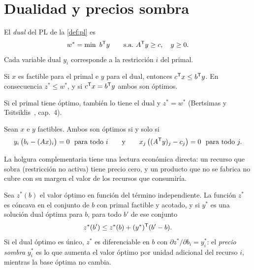 \section{Dualidad y precios sombra}

\begin{definicion}\label{def:dual}
El \emph{dual} del PL de la \cref{def:pl} es
\[
w^{*}=\min\ b^{\mathsf{T}} y\qquad\text{s.a.}\  A^{\mathsf{T}} y\ge c,\quad y\ge 0.
\]
Cada variable dual $y_i$ corresponde a la restricción $i$ del primal.
\end{definicion}

\begin{teorema}\label{teo:dual-debil}
Si $x$ es factible para el primal e $y$ para el dual, entonces $c^{\mathsf{T}} x\le b^{\mathsf{T}} y$. En consecuencia $z^{*}\le w^{*}$, y si $c^{\mathsf{T}} x=b^{\mathsf{T}} y$ ambos son óptimos.
\end{teorema}

\begin{teorema}\label{teo:dual-fuerte}
Si el primal tiene óptimo, también lo tiene el dual y $z^{*}=w^{*}$ (Bertsimas y Tsitsiklis~\cite{bt}, cap.~4).
\end{teorema}

\begin{corolario}\label{cor:holgura}
Sean $x$ e $y$ factibles. Ambos son óptimos si y solo si
\[
y_i\,\bigl(b_i-(Ax)_i\bigr)=0\ \ \text{para todo }i\qquad\text{y}\qquad x_j\,\bigl((A^{\mathsf{T}} y)_j-c_j\bigr)=0\ \ \text{para todo }j.
\]
\end{corolario}

La holgura complementaria tiene una lectura económica directa: un recurso que sobra (restricción no activa) tiene precio cero, y un producto que no se fabrica no cubre con su margen el valor de los recursos que consumiría.

\begin{proposicion}\label{prop:sombra}
Sea $z^{*}(b)$ el valor óptimo en función del término independiente. La función $z^{*}$ es cóncava en el conjunto de $b$ con primal factible y acotado, y si $y^{*}$ es una solución dual óptima para $b$, para todo $b'$ de ese conjunto
\[
z^{*}(b')\le z^{*}(b)+(y^{*})^{\mathsf{T}}(b'-b).
\]
Si el dual óptimo es único, $z^{*}$ es diferenciable en $b$ con $\partial z^{*}/\partial b_i=y_i^{*}$: el \emph{precio sombra} $y_i^{*}$ es lo que aumenta el valor óptimo por unidad adicional del recurso $i$, mientras la base óptima no cambia.
\end{proposicion}

